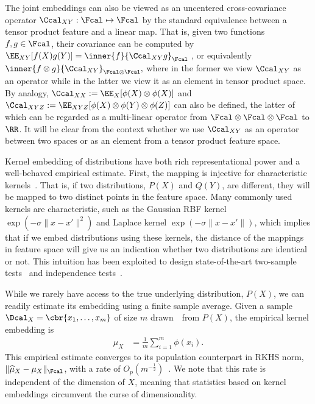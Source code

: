 \documentclass[11pt]{article}
\newcommand{\hmu}{\widehat{\mu}}
\begin{document}
The joint embeddings can also be viewed as an uncentered cross-covariance operator $\Ccal_{XY}:\Fcal\mapsto \Fcal$ by the standard equivalence between a tensor product feature and a linear map.
That is, given two functions $f,g\in\Fcal$, their covariance can be computed by
$
    \EE_{XY}[f(X)g(Y)]=\inner{f}{\Ccal_{XY} g}_{\Fcal}
$
, or equivalently
$
\inner{f\otimes g}{\Ccal_{XY}}_{\Fcal\otimes\Fcal},
$
where in the former we view $\Ccal_{XY}$ as an operator while in the latter we view it as an element in tensor product space.
By analogy, $\Ccal_{XX} := \EE_X[\phi(X)\otimes \phi(X)]$ and $\Ccal_{XYZ} := \EE_{XYZ}[\phi(X)\otimes\phi(Y)\otimes \phi(Z)]$ can also be defined,
the latter of which can be regarded as a multi-linear operator from $\Fcal\otimes\Fcal\otimes\Fcal$ to $\RR$.
It will be clear from the context whether we use $\Ccal_{XY}$ as an operator between two spaces or as an element from a tensor product feature space.

Kernel embedding of distributions have both rich representational power and a well-behaved empirical estimate.
 First, the mapping is injective for characteristic kernels~\cite{SriGreFukLanetal08}. That is, if two distributions, $P(X)$ and $Q(Y)$, are different, they will be mapped to two distinct points in the feature space. Many commonly used kernels are characteristic, such as the Gaussian RBF kernel $\exp(-\sigma \|x - x'\|^2)$ and Laplace kernel $\exp(-\sigma \|x - x'\|)$, which implies that if we embed distributions using these kernels, the distance of the mappings in feature space will give us an indication whether two distributions are identical or not.
This intuition has been exploited to design  state-of-the-art two-sample tests~\cite{GreBorRasSchetal12} and  independence tests~\cite{GreFukTeoSonetal08}.

While we rarely have access to the true underlying distribution, $P(X)$,
we can readily estimate its embedding using a finite sample average. Given a sample $\Dcal_{X} = \cbr{x_1, \ldots, x_m}$ of size $m$ drawn~\iid~from $P(X)$, the empirical kernel embedding is
\begin{align}
    \hmu_{X} &= \frac{1}{m} \sum\nolimits_{i=1}^m \phi(x_i). \label{eq:empirical_embedding}
\end{align}
This empirical estimate converges to its population counterpart in RKHS norm, $\|\hmu_X - \mu_X \|_{\Fcal}$, with a rate of $O_p(m^{-\frac{1}{2}})$~\cite{SmoGreSonSch07}. We note that this rate is independent of the dimension of $X$, meaning that statistics based on kernel embeddings circumvent the curse of dimensionality.
\end{document}
